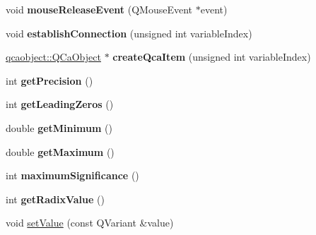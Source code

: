 \begin{DoxyCompactItemize}
\item 
\hypertarget{classQENumericEdit_a95a20562c9955d064d93d98968e9fc64}{
void {\bfseries mouseReleaseEvent} (QMouseEvent $\ast$event)}
\label{classQENumericEdit_a95a20562c9955d064d93d98968e9fc64}

\item 
\hypertarget{classQENumericEdit_a08a3300b866df9ca995129fa369c3775}{
void {\bfseries establishConnection} (unsigned int variableIndex)}
\label{classQENumericEdit_a08a3300b866df9ca995129fa369c3775}

\item 
\hypertarget{classQENumericEdit_a237e65e31b0107e7158015496beb03e8}{
\hyperlink{classqcaobject_1_1QCaObject}{qcaobject::QCaObject} $\ast$ {\bfseries createQcaItem} (unsigned int variableIndex)}
\label{classQENumericEdit_a237e65e31b0107e7158015496beb03e8}

\item 
\hypertarget{classQENumericEdit_a97404fbbe18143430ad0fa818d4940c0}{
int {\bfseries getPrecision} ()}
\label{classQENumericEdit_a97404fbbe18143430ad0fa818d4940c0}

\item 
\hypertarget{classQENumericEdit_a832a7b6be968b9cc5c61fa868971e4d1}{
int {\bfseries getLeadingZeros} ()}
\label{classQENumericEdit_a832a7b6be968b9cc5c61fa868971e4d1}

\item 
\hypertarget{classQENumericEdit_a779e036fb2f6d9349e72e08d900e9a0f}{
double {\bfseries getMinimum} ()}
\label{classQENumericEdit_a779e036fb2f6d9349e72e08d900e9a0f}

\item 
\hypertarget{classQENumericEdit_a64b1347feba76d1bbac9d7a8f2f86401}{
double {\bfseries getMaximum} ()}
\label{classQENumericEdit_a64b1347feba76d1bbac9d7a8f2f86401}

\item 
\hypertarget{classQENumericEdit_aa44395f7383a0d60d0a6e38be29a7aaf}{
int {\bfseries maximumSignificance} ()}
\label{classQENumericEdit_aa44395f7383a0d60d0a6e38be29a7aaf}

\item 
\hypertarget{classQENumericEdit_ae192ff06d387a91e668816377fb61531}{
int {\bfseries getRadixValue} ()}
\label{classQENumericEdit_ae192ff06d387a91e668816377fb61531}

\item 
\hypertarget{classQENumericEdit_a4ed3ce06c46676dc35e977cc10266210}{
void \hyperlink{classQENumericEdit_a4ed3ce06c46676dc35e977cc10266210}{setValue} (const QVariant \&value)}
\label{classQENumericEdit_a4ed3ce06c46676dc35e977cc10266210}


\end{DoxyCompactItemize}
